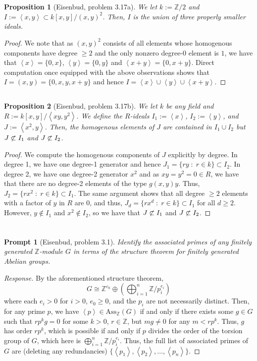 \documentclass[english]{article}
\newcommand{\ZZ}{\mathbb{Z}}
\newcommand{\prob}[1]{\setcounter{section}{#1-1}\section{}}
\newcommand{\prt}[1]{\setcounter{subsection}{#1-1}\subsection{}}
\newtheorem*{prop*}{Proposition}
\newtheorem*{prompt*}{Prompt}
\theoremstyle{remark}
\theoremstyle{definition}
\newcommand{\ass}{\mathrm{Ass}}
\newcommand{\idl}[1]{\left\langle{#1}\right\rangle }
\begin{document}
\prob{7}
\prt{1}\begin{prop*}[Eisenbud, problem 3.17a]
We let $k:=\ZZ/2$ and $I:=\idl{x,y}\subset k[x,y]/(x,y)^2$. Then, $I$ is the union of three properly smaller ideals. 
\end{prop*}
\begin{proof}
We note that as $(x,y)^2$ consists of all elements whose homogenous components have degree $\geq 2$ and the only nonzero degree-0 element is $1$, we have that $\idl{x}=\{0,x\}$, $\idl{y}=\{0,y\}$ and $\idl{x+y}=\{0,x+y\}$. Direct computation once equipped with the above observations shows that $I=(x,y)=\{0,x,y,x+y\}$ and hence $I=\idl{x}\cup \idl{y}\cup \idl{x+y}$.
\end{proof}
\prt{2}\begin{prop*}[Eisenbud, problem 3.17b]
We let $k$ be any field and $R:=k[x,y]/\idl{xy,y^2}$. We define the $R$-ideals $I_1:=\idl{x}$, $I_2:=\idl{y}$, and $J:=\idl{x^2,y }$. Then, the homogenous elements of $J$ are contained in $I_1\cup I_2$ but $J\centernot\subset I_1$ and $J\centernot\subset I_2$. 
\end{prop*}
\begin{proof}
	We compute the homogenous components of $J$ explicitly by degree. In degree 1, we have one degree-1 generator and hence $J_1=\{ry\;:\;r\in k\}\subset I_2$. In degree 2, we have one degree-2 generator $x^2$ and as $xy=y^2=0\in R$, we have that there are no degree-2 elements of the type $g(x,y)y$. Thus, $J_{2}=\{rx^2\;:\;r\in k\}\subset I_1$. The same argument shows that all degree $\geq 2$ elements with a factor of $y$ in $R$ are $0$, and thus, $J_{d}=\{rx^d\;:\;r\in k\}\subset I_1$ for all $d\geq 2$. However, $y\not\in I_1$ and $x^2\notin I_2$, so we have that $J\centernot\subset I_1$ and $J\centernot\subset I_2$. 
\end{proof}
\prob{8}
\begin{prompt*}[Eisenbud, problem 3.1]
Identify the associated primes of any finitely generated $\ZZ$-module $G$ in terms of the structure theorem for finitely generated Abelian groups. 
\end{prompt*}\begin{proof}[Response]
By the aforementioned structure theorem, $$G\cong\ZZ^{e_0}\oplus\left( \bigoplus_{i=1}^n \ZZ/p_i^{e_i}\right)$$ where each $e_i>0$ for $i>0$, $e_0\geq 0$, and the $p_i$ are not necessarily distinct. Then, for any prime ${p}$, we have $\idl{p}\in \ass_\ZZ(G)$ if and only if there exists some $g\in G$ such that $rp^kg=0$ for some $k>0$, $r\in \ZZ$, but $mg\neq 0$ for any $m<rp^k$. Thus, $g$ has order $rp^k$, which is possible if and only if $p$ divides the order of the torsion group of $G$, which here is $\bigoplus_{i=1}^n \ZZ/p_i^{e_i}$. Thus, the full list of associated primes of $G$ are (deleting any redundancies) $\{\idl{p_1},\idl{p_2},\hdots,\idl{p_n}\}$.
\end{proof}
\end{document}
